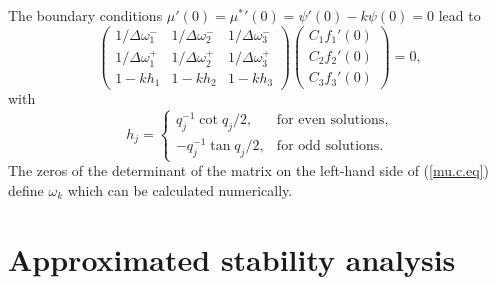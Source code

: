 The boundary conditions $\mu'(0)={\mu^*}'(0)=\psi'(0)-k\psi(0)=0$ 
lead to
\begin{equation}
  \left(\begin{array}{ccc}
   1/\Delta\omega_1^-&1/\Delta\omega_2^-&1/\Delta\omega_3^-\\
   1/\Delta\omega_1^+&1/\Delta\omega_2^+&1/\Delta\omega_3^+\\
   1-kh_1&1-kh_2&1-kh_3\end{array}\right)\left(\begin{array}{c}
   C_1f_1'(0)\\C_2f_2'(0)\\C_3f_3'(0)\end{array}\right)=0,
  \label{mu.c.eq}
\end{equation}
with
\begin{equation}
  h_j=\left\{\begin{array}{ll}q_j^{-1}\cot q_j/2,
   &\mbox{for even solutions},\\-q_j^{-1}\tan q_j/2,
   &\mbox{for odd solutions}.\end{array}\right.
  \label{mu.c.hj}
\end{equation}
The zeros of the determinant of the matrix on the left-hand side of 
(\ref{mu.c.eq}) define $\omega_k$ which can be calculated
numerically.


\section{\protect\label{APB}Approximated stability analysis}

